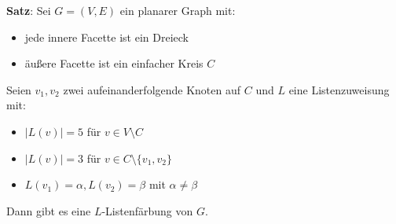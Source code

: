 \textbf{Satz}: Sei $G=(V,E)$ ein planarer Graph mit:
\begin{itemize}
	\item jede innere Facette ist ein Dreieck
	\item äußere Facette ist ein einfacher Kreis $C$
\end{itemize}
Seien $v_1,v_2$ zwei aufeinanderfolgende Knoten auf $C$ und $L$ eine Listenzuweisung mit:
\begin{itemize}
	\item $|L(v)|=5$ für $v\in V\setminus C$
	\item $|L(v)|=3$ für $v\in C\setminus \{v_1,v_2\}$
	\item $L(v_1)=\alpha, L(v_2)=\beta$ mit $\alpha\neq\beta$
\end{itemize}
Dann gibt es eine $L$-Listenfärbung von $G$.

